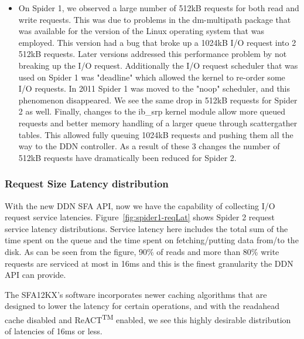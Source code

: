 \begin{itemize}
\item   On Spider 1, we observed a large number of 512kB requests for both read
and write requests. This was due to problems in the dm-multipath \cite{mpath} 
package that was available for the version of the Linux operating system that was 
employed. This version had a bug that broke up a 1024kB I/O request into 2 
512kB requests. Later versions addressed this performance problem by not breaking 
up the I/O request. Additionally the I/O request scheduler that was used on 
Spider 1 was "deadline" which allowed the kernel to re-order some I/O requests. 
In 2011 Spider 1 was moved to the "noop" scheduler, and this phenomenon 
disappeared. We see the same drop in 512kB requests for Spider 2 as well. Finally, 
changes to the ib\_srp kernel module allow more queued requests and better memory 
handling of a larger queue through scatter\/gather tables. This allowed fully 
queuing 1024kB requests and pushing them all the way to the DDN controller. As 
a result of these 3 changes the number of 512kB requests have dramatically been 
reduced for Spider 2.
\end{itemize}

\subsubsection{Request Size Latency distribution}

With the new DDN SFA API, now we have the capability of collecting I/O request
service latencies. Figure~\ref{fig:spider1-reqLat} shows Spider 2 request service
latency distributions. Service latency here includes the total sum of the time
spent on the queue and the time spent on fetching/putting data from/to the
disk. As can be seen from the figure, 90\% of reads and more than 80\% write
requests are serviced at most in 16ms and this is the finest granularity the
DDN API can provide. 

The SFA12KX's software incorporates newer caching algorithms that are designed to 
lower the latency for certain operations, and with the readahead cache disabled 
and ReACT\textsuperscript{TM} enabled, we see this highly desirable distribution 
of latencies of 16ms or less.

